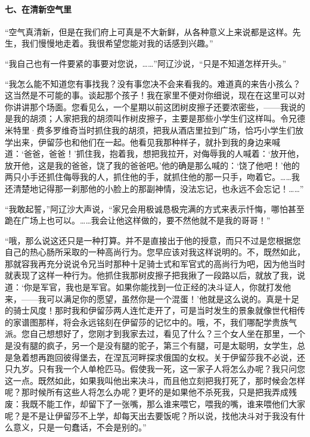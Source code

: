\paragraph*{七、在清新空气里}
\par “空气真清新，但是在我们府上可真是不大新鲜，从各种意义上来说都是这样。先生，我们慢慢地走着。我很希望您能对我的话感到兴趣。”
\par “我自己也有一件要紧的事要对您说，……”阿辽沙说，“只是不知道怎样开头。”
\par “我怎么能不知道您有事找我？没有事您决不会来看我的。难道真的来告小孩么？这当然是不可能的事。谈起那个孩子！我在家里不便对你细说，现在在这里可以对你讲讲那个场面。您看见么，一个星期以前这团树皮擦子还要浓密些，——我说的是我的胡须；人家把我的胡须叫作树皮擦子，主要是那些小学生们这样叫。令兄德米特里·费多罗维奇当时抓住我的胡须，把我从酒店里拉到广场，恰巧小学生们放学出来，伊留莎也和他们在一起。他看见我那种样子，就扑到我的身边来喊道：‘爸爸，爸爸！’抓住我，抱着我，想把我拉开，对侮辱我的人喊着：‘放开他，放开他，这是我的爸爸，饶了我的爸爸吧。’他的确是那么喊的：‘饶了他吧！’他的两只小手还抓住侮辱我的人，抓住他的手，就抓住他的那一只手，吻着它。……我还清楚地记得那一刹那他的小脸上的那副神情，没法忘记，也永远不会忘记！……”
\par “我敢起誓，”阿辽沙大声说，“家兄会用极诚恳极完满的方式来表示忏悔，哪怕甚至跪在广场上也可以。……我会让他这样做的，要不然他就不是我的哥哥！”
\par “哦，那么说这还只是一种打算。并不是直接出于他的授意，而只不过是您根据您自己的热心肠所采取的一种高尚行为。您早应该对我这样说明的。不，既然如此，那就容我再充分说说令兄当时那种十足骑士式和军官式的高尚行为吧，因为他当时就表现了这样一种行为。他抓住我那树皮擦子把我揪了一段路以后，就放了我，说道：‘你是军官，我也是军官。如果你能找到一位正经的决斗证人，你就打发他来，——我可以满足你的愿望，虽然你是一个混蛋！’他就是这么说的。真是十足的骑士风度！那时我和伊留莎两人连忙走开了，可是当时发生的景象就像世代相传的家谱图那样，将会永远铭刻在伊留莎的记忆中的。哦，不，我们哪配学贵族气派。您自己想想好了，您刚才到我家去过，看见了什么？三个女人坐在那里，一个是没有腿的疯子，另一个是没有腿的驼子，第三个有腿，可是太聪明，女学生，总是急着想再跑回彼得堡去，在涅瓦河畔探求俄国的女权。关于伊留莎我不必说，还只九岁。只有我一个人单枪匹马。假使我一死，这一家子人将怎么办呢？我只问您这一点。既然如此，如果我叫他出来决斗，而且他立刻把我打死了，那时候会怎样呢？那时候所有这些人将怎么办呢？更坏的是如果他不杀死我，只是把我弄成残废：我既不能工作，却留下了一张嘴，那么谁来喂它，喂我的嘴，谁来喂他们大家呢？是不是让伊留莎不上学，却每天出去要饭呢？所以说，找他决斗对于我没有什么意义，只是一句蠢话，不会是别的。”

